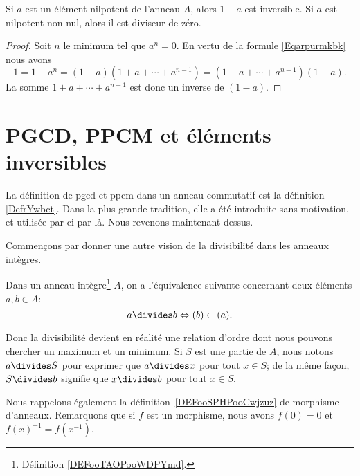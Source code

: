 \begin{proposition}
	Si \( a\) est un élément nilpotent de l'anneau \( A\), alors \( 1-a\) est inversible. Si \( a\) est nilpotent non nul, alors il est diviseur de zéro.
\end{proposition}

\begin{proof}
	Soit \( n\) le minimum tel que \( a^n=0\). En vertu de la formule \eqref{Eqarpurmkbk} nous avons
	\begin{equation}
		1=1-a^n=(1-a)(1+a+\cdots+a^{n-1})=(1+a+\cdots+a^{n-1})(1-a).
	\end{equation}
	La somme \( 1+a+\cdots+a^{n-1}\) est donc un inverse de \( (1-a)\).
\end{proof}

\section{PGCD, PPCM et éléments inversibles}

La définition de pgcd et ppcm dans un anneau commutatif est la définition \ref{DefrYwbct}. Dans la plus grande tradition, elle a été introduite sans motivation, et utilisée par-ci par-là. Nous revenons maintenant dessus.

Commençons par donner une autre vision de la divisibilité dans les anneaux intègres.
\begin{proposition}\label{PropDiviseurIdeaux}
	Dans un anneau intègre\footnote{Définition \ref{DEFooTAOPooWDPYmd}.} \( A\), on a l'équivalence suivante concernant deux éléments \( a, b \in A \):
	\begin{equation}
		a\divides b\Leftrightarrow (b)\subset (a).
	\end{equation}
\end{proposition}

Donc la divisibilité devient en réalité une relation d'ordre dont nous pouvons chercher un maximum et un minimum. Si \( S\) est une partie de \( A\), nous notons \( a\divides S\) pour exprimer que \( a\divides x\) pour tout \( x\in S\); de la même façon, \( S\divides b\) signifie que \( x\divides b\) pour tout \( x\in S\).

Nous rappelons également la définition~\ref{DEFooSPHPooCwjzuz} de morphisme d'anneaux. Remarquons que si \( f\) est un morphisme, nous avons \( f(0)=0\) et \( f(x)^{-1}=f(x^{-1})\).


